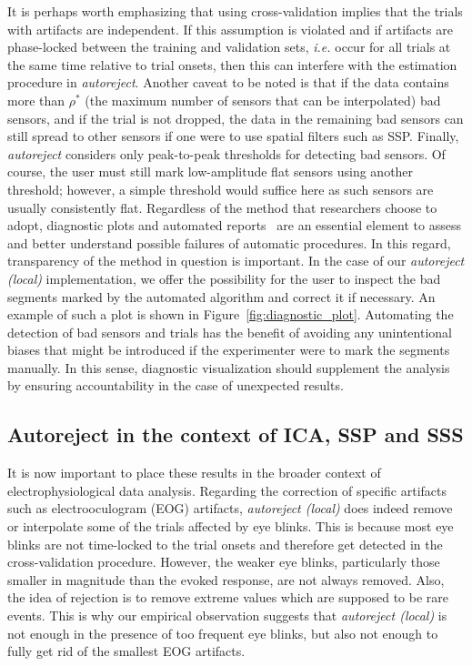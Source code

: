 It is perhaps worth emphasizing that using cross-validation implies that the trials with artifacts are independent. If this assumption is violated and if artifacts are phase-locked between the training and validation sets, \emph{i.e.} occur for all trials at the same time relative to trial onsets, then this can interfere with the estimation procedure in \emph{autoreject}. Another caveat to be noted is that if the data contains more than $\rho^{*}$ (the maximum number of sensors that can be interpolated) bad sensors, and if the trial is not dropped, the data in the remaining bad sensors can still spread to other sensors if one were to use spatial filters such as SSP. Finally, \emph{autoreject} considers only peak-to-peak thresholds for detecting bad sensors. Of course, the user must still mark low-amplitude flat sensors using another threshold; however, a simple threshold would suffice here as such sensors are usually consistently flat.
Regardless of the method that researchers choose to adopt, diagnostic plots and automated reports~\citep{dengemann2015conc} are an essential element to assess and better understand possible failures of automatic procedures. In this regard, transparency of the method in question is important. In the case of our \emph{autoreject (local)} implementation, we offer the possibility for the user to inspect the bad segments marked by the automated algorithm and correct it if necessary. An example of such a plot is shown in Figure~\ref{fig:diagnostic_plot}. Automating the detection of bad sensors and trials has the benefit of avoiding any unintentional biases that might be introduced if the experimenter were to mark the segments manually. In this sense, diagnostic visualization should supplement the analysis by ensuring accountability in the case of unexpected results.

\subsection{Autoreject in the context of ICA, SSP and SSS}

It is now important to place these results in the broader context of electrophysiological data analysis. Regarding the correction of specific artifacts such as electrooculogram (EOG) artifacts, \emph{autoreject (local)} does indeed remove or interpolate some of the trials affected by eye blinks. This is because most eye blinks are not time-locked to the trial onsets and therefore get detected in the cross-validation procedure. However, the weaker eye blinks, particularly those smaller in magnitude than the evoked response, are not always removed. Also, the idea of rejection is to remove extreme values which are supposed to be rare events. This is why our empirical observation suggests that \emph{autoreject (local)} is not enough in the presence of too frequent eye blinks, but also not enough to fully get rid of the smallest EOG artifacts. 

